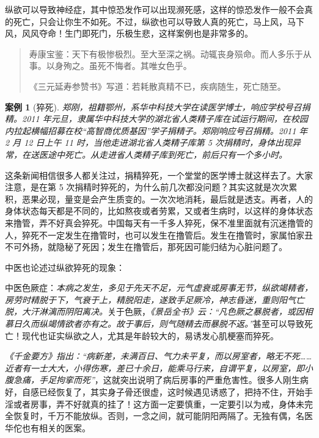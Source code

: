 \documentclass{ctexart}
\newtheorem{case}{案例}
\begin{document}
纵欲可以导致神经症，其中惊恐发作可以出现濒死感，这样的惊恐发作一般不会真的死亡，只会让你生不如死。不过，纵欲也可以导致人真的死亡，马上风，马下风，风风夺命！生门即死门，乐极生悲，这样案例也是非常多的。

\begin{quotation}
    寿康宝鉴：天下有极惨极烈。至大至深之祸。动辄丧身殒命。而人多乐于从事。以身殉之。虽死不悔者。其唯女色乎。

    《三元延寿参赞书》写道：若耗散真精不已，疾病随生，死亡随至。
\end{quotation}

\begin{case}[猝死]
    郑刚，祖籍鄂州，系华中科技大学在读医学博士，响应学校号召捐精。2011 年元旦，隶属华中科技大学的湖北省人类精子库在试运行期间，在校园内拉起横幅招募在校“高智商优质基因”学子捐精子。郑刚响应号召捐精。2011 年 2 月 12 日上午 11 时，当他走进湖北省人类精子库第 5 次捐精时，身体出现异常，在送医途中死亡。从走进省人类精子库到死亡，前后只有一个多小时。
\end{case}

这条新闻相信很多人都关注过，捐精猝死，一个堂堂的医学博士就这样去了。大家注意，是在第 5 次捐精时猝死的，为什么前几次都没问题？其实这就是次次累积，恶果必现，量变是会产生质变的。一次次地消耗，最后就是透支。再者，人的身体状态每天都是不同的，比如熬夜或者劳累，又或者生病时，以这样的身体状态来撸管，弄不好真会猝死。中国每天有一千多人猝死，保不准里面就有沉迷撸管的人，猝死不一定发生在撸管时，也可以发生在撸管后。发生在撸管时，家属怕家丑不可外扬，就隐秘了死因；发生在撸管后，那死因可能归结为心脏问题了。

中医也论述过纵欲猝死的现象：

中医色厥症：{\it 本病之发生，多见于先天不足，元气虚衰或房事无节，纵欲竭精者，房劳时精脱于下，气衰于上，精脱阳走，遂致手足厥冷，神志昏迷，重则阳气亡脱，大汗淋漓而阴阳离决。}关于色厥，{\it 《景岳全书》云：“凡色厥之暴脱者，或因相慕日久而纵竭情欲者亦有之。故于事后，则气随精去而暴脱不返。”}甚至可以导致死亡！现代也证实纵欲之人，尤其是年龄较大的，易诱发心肌梗塞而猝死。

{\it 《千金要方》指出：“病新差，未满百日、气力未平复，而以房室者，略无不死……近者有一士大大，小得伤寒，差已十余日，能乘马行来，自谓平复，以房室，即小腹急痛，手足拘挛而死”}，这就突出说明了病后房事的严重危害性。很多人刚生病好，自感已经恢复了，其实身子骨还很虚，这时候遇见诱惑了，把持不住，开始手淫或者房事，弄不好就真的挂了！这方面一定要慎重，一定要引以为戒，身体未完全恢复时，千万不能放纵。否则，一念之间，就可能阴阳两隔了。无独有偶，名医华佗也有相关的医案。
\end{document}
